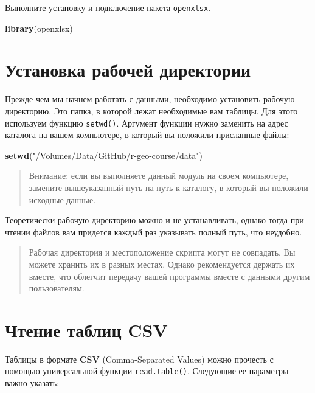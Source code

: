 \documentclass[]{book}
\newenvironment{Shaded}{\begin{snugshade}}{\end{snugshade}}
\newcommand{\KeywordTok}[1]{\textcolor[rgb]{0.13,0.29,0.53}{\textbf{#1}}}
\newcommand{\StringTok}[1]{\textcolor[rgb]{0.31,0.60,0.02}{#1}}
\newcommand{\NormalTok}[1]{#1}
\begin{document}
Выполните установку и подключение пакета \texttt{openxlsx}.

\begin{Shaded}
\begin{Highlighting}[]
\KeywordTok{library}\NormalTok{(openxlsx)}
\end{Highlighting}
\end{Shaded}

\section{Установка рабочей директории}\label{set_directory}

Прежде чем мы начнем работать с данными, необходимо установить рабочую
директорию. Это папка, в которой лежат необходимые вам таблицы. Для
этого используем функцию \texttt{setwd()}. Аргумент функции нужно
заменить на адрес каталога на вашем компьютере, в который вы положили
присланные файлы:

\begin{Shaded}
\begin{Highlighting}[]
\KeywordTok{setwd}\NormalTok{(}\StringTok{"/Volumes/Data/GitHub/r-geo-course/data"}\NormalTok{)}
\end{Highlighting}
\end{Shaded}

\begin{quote}
Внимание: если вы выполняете данный модуль на своем компьютере, замените
вышеуказанный путь на путь к каталогу, в который вы положили исходные
данные.
\end{quote}

Теоретически рабочую директорию можно и не устанавливать, однако тогда
при чтении файлов вам придется каждый раз указывать полный путь, что
неудобно.

\begin{quote}
Рабочая директория и местоположение скрипта могут не совпадать. Вы
можете хранить их в разных местах. Однако рекомендуется держать их
вместе, что облегчит передачу вашей программы вместе с данными другим
пользователям.
\end{quote}

\section{Чтение таблиц CSV}\label{reading_csv}

Таблицы в формате \textbf{CSV} (Comma-Separated Values) можно прочесть с
помощью универсальной функции \texttt{read.table()}. Следующие ее
параметры важно указать:
\end{document}
